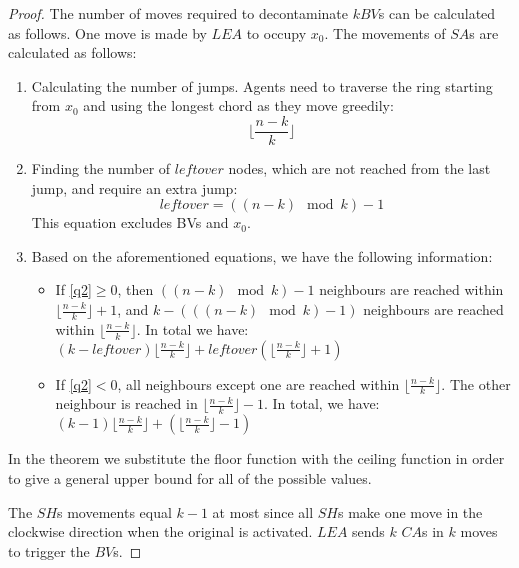 \begin{proof}
The number of moves required to decontaminate $k BV$s can be calculated as follows. One move is made by $LEA$ to occupy $x_{0}$. The movements of $SA$s are calculated as follows:
\begin{enumerate}
  \item Calculating the number of jumps. Agents need to traverse the ring starting from $x_{0}$ and using the longest chord as they move greedily: \begin{equation}\label{q1}
\lfloor \frac {n-k}{k} \rfloor 
\end {equation}
  \item Finding the number of $leftover$ nodes, which are not reached from the last jump, and require an extra jump:
 \begin{equation}\label{q2}
leftover=((n-k)\mod k ) -1 
\end {equation}   
This equation excludes BVs and $x_{0}$.
  
  \item Based on the aforementioned equations, we have the following information: 
\begin{itemize}

\item If \ref{q2}$\ge 0$, then $((n-k)\mod k ) -1$  neighbours are reached within $\lfloor \frac {n-k}{k} \rfloor  +1$,  
and $k- ( ((n-k)\mod k ) -1)$ neighbours are reached within $\lfloor \frac {n-k}{k} \rfloor  $. In total we have: \\
$(k- leftover) \lfloor \frac {n-k}{k} \rfloor + leftover (\lfloor \frac {n-k}{k} \rfloor  +1)$
\item If \ref{q2}$< 0 $, all neighbours except one are reached within $\lfloor \frac {n-k}{k} \rfloor $. The other neighbour is reached in $\lfloor \frac {n-k}{k} \rfloor -1$. In total, we have: \\
$(k-1)\lfloor \frac {n-k}{k} \rfloor + (\lfloor \frac {n-k}{k} \rfloor -1)$
\end {itemize}
\end{enumerate}
In the theorem we substitute the floor function with the ceiling function in order to give a general upper bound for all of the possible values.

The $SH$s movements equal $k-1$  at most since all $SH$s make one move in the clockwise direction when the original \bv is activated. $LEA$ sends $k$ $CA$s in $k$ moves to trigger the $BV$s.


\end{proof}




